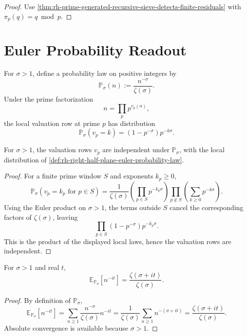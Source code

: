 \begin{proof}
Use
\autoref{thm:rh-prime-generated-recursive-sieve-detects-finite-residuals}
with $\pi_p(q)=q\bmod p$.
\end{proof}

\section{Euler Probability Readout}
\label{sec:rh-prime-generated-recursive-euler-probability}

\begin{definition}
\label{def:rh-right-half-plane-euler-probability-law}
For $\sigma>1$, define a probability law on positive integers by
$$
\mathbb P_{\sigma}(n)
:=
\frac{n^{-\sigma}}{\zeta(\sigma)}.
$$
Under the prime factorization
$$
n=\prod_p p^{v_p(n)},
$$
the local valuation row at prime $p$ has distribution
$$
\mathbb P_{\sigma}(v_p=k)
=
(1-p^{-\sigma})p^{-k\sigma}.
$$
\end{definition}

\begin{theorem}
\label{thm:rh-euler-probability-factors-by-prime-valuations}
For $\sigma>1$, the valuation rows $v_p$ are independent under
$\mathbb P_{\sigma}$, with the local distribution of
\autoref{def:rh-right-half-plane-euler-probability-law}.
\end{theorem}

\begin{proof}
For a finite prime window $S$ and exponents $k_p\ge0$,
$$
\mathbb P_{\sigma}(v_p=k_p\text{ for }p\in S)
=
\frac{1}{\zeta(\sigma)}
\left(\prod_{p\in S}p^{-k_p\sigma}\right)
\prod_{p\notin S}\left(\sum_{k\ge0}p^{-k\sigma}\right).
$$
Using the Euler product on $\sigma>1$, the terms outside $S$ cancel the
corresponding factors of $\zeta(\sigma)$, leaving
$$
\prod_{p\in S}(1-p^{-\sigma})p^{-k_p\sigma}.
$$
This is the product of the displayed local laws, hence the valuation
rows are independent.
\end{proof}

\begin{theorem}
\label{thm:rh-zeta-ratio-phase-expectation}
For $\sigma>1$ and real $t$,
$$
\mathbb E_{\mathbb P_{\sigma}}[n^{-it}]
=
\frac{\zeta(\sigma+it)}{\zeta(\sigma)}.
$$
\end{theorem}

\begin{proof}
By definition of $\mathbb P_{\sigma}$,
$$
\mathbb E_{\mathbb P_{\sigma}}[n^{-it}]
=
\sum_{n\ge1}\frac{n^{-\sigma}}{\zeta(\sigma)}n^{-it}
=
\frac{1}{\zeta(\sigma)}
\sum_{n\ge1}n^{-(\sigma+it)}
=
\frac{\zeta(\sigma+it)}{\zeta(\sigma)}.
$$
Absolute convergence is available because $\sigma>1$.
\end{proof}

